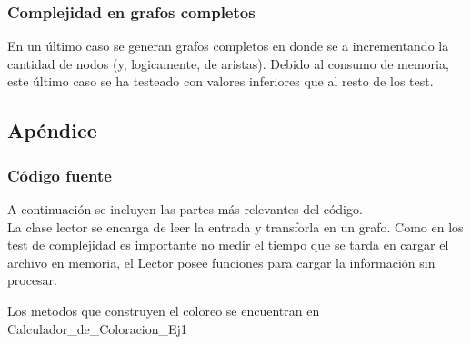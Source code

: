 \subsubsection{Complejidad en grafos completos}
En un último caso se generan grafos completos en donde se a incrementando la cantidad de nodos (y, logicamente, de aristas). Debido al consumo de memoria, este último caso se ha testeado con valores inferiores que al resto de los test.




\subsection{Apéndice}
\subsubsection{Código fuente}

 A continuación se incluyen las partes más relevantes del código.\\
 La clase lector se encarga de leer la entrada y transforla en un grafo. Como en los test de complejidad es importante no medir el tiempo que se tarda en cargar el archivo en memoria, el Lector posee funciones para cargar la información sin procesar.
 
 Los metodos que construyen el coloreo se encuentran en Calculador_de_Coloracion_Ej1 \\
 
